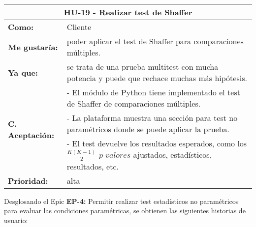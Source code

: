 
\begin{table}[H]
	\begin{tabular}{| p{3cm}| p{11cm} |}
		\hline
		\multicolumn{2}{|c|}{\textbf{HU-19} - Realizar test de Shaffer} \\ \hline
		\textbf{Como:} & Cliente \\ \hline
		\textbf{Me gustaría:} & poder aplicar el test de Shaffer para comparaciones múltiples. \\ \hline
		\textbf{Ya que:} & se trata de una prueba multitest con mucha potencia y puede que rechace muchas más hipótesis. \\ \hline
		\multirow{3}{11cm}{\textbf{C. Aceptación:}} & - El módulo de Python tiene implementado el test de Shaffer de comparaciones múltiples. \\
		& - La plataforma muestra una sección para test no paramétricos donde se puede aplicar la prueba. \\
		& - El test devuelve los resultados esperados, como los $\frac{K(K-1)}{2}$ $\textit{p-valores}$ ajustados, estadísticos, resultados, etc. \\ \hline
		\textbf{\textbf{Prioridad:}} & alta \\ \hline
	\end{tabular}
\end{table}


\clearpage
Desglosando el Epic \textbf{EP-4:} Permitir realizar test estadísticos no paramétricos para evaluar las condiciones paramétricas, se obtienen las siguientes historias de usuario:

